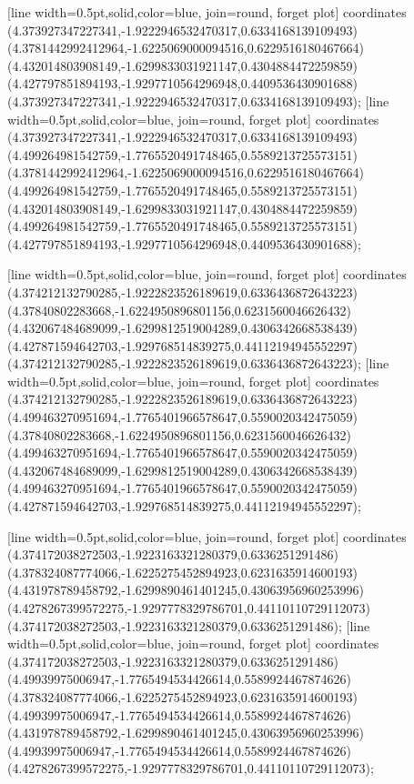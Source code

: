 [line width=0.5pt,solid,color=blue, join=round, forget plot] coordinates {(4.373927347227341,-1.9222946532470317,0.6334168139109493) (4.3781442992412964,-1.6225069000094516,0.6229516180467664) (4.432014803908149,-1.6299833031921147,0.4304884472259859) (4.427797851894193,-1.9297710564296948,0.4409536430901688) (4.373927347227341,-1.9222946532470317,0.6334168139109493)};
[line width=0.5pt,solid,color=blue, join=round, forget plot] coordinates {(4.373927347227341,-1.9222946532470317,0.6334168139109493) (4.499264981542759,-1.7765520491748465,0.5589213725573151) (4.3781442992412964,-1.6225069000094516,0.6229516180467664) (4.499264981542759,-1.7765520491748465,0.5589213725573151) (4.432014803908149,-1.6299833031921147,0.4304884472259859) (4.499264981542759,-1.7765520491748465,0.5589213725573151) (4.427797851894193,-1.9297710564296948,0.4409536430901688)};

[line width=0.5pt,solid,color=blue, join=round, forget plot] coordinates {(4.374212132790285,-1.9222823526189619,0.6336436872643223) (4.37840802283668,-1.6224950896801156,0.6231560046626432) (4.432067484689099,-1.6299812519004289,0.4306342668538439) (4.427871594642703,-1.929768514839275,0.44112194945552297) (4.374212132790285,-1.9222823526189619,0.6336436872643223)};
[line width=0.5pt,solid,color=blue, join=round, forget plot] coordinates {(4.374212132790285,-1.9222823526189619,0.6336436872643223) (4.499463270951694,-1.7765401966578647,0.5590020342475059) (4.37840802283668,-1.6224950896801156,0.6231560046626432) (4.499463270951694,-1.7765401966578647,0.5590020342475059) (4.432067484689099,-1.6299812519004289,0.4306342668538439) (4.499463270951694,-1.7765401966578647,0.5590020342475059) (4.427871594642703,-1.929768514839275,0.44112194945552297)};

[line width=0.5pt,solid,color=blue, join=round, forget plot] coordinates {(4.374172038272503,-1.9223163321280379,0.6336251291486) (4.378324087774066,-1.6225275452894923,0.6231635914600193) (4.431978789458792,-1.6299890461401245,0.43063956960253996) (4.4278267399572275,-1.9297778329786701,0.44110110729112073) (4.374172038272503,-1.9223163321280379,0.6336251291486)};
[line width=0.5pt,solid,color=blue, join=round, forget plot] coordinates {(4.374172038272503,-1.9223163321280379,0.6336251291486) (4.49939975006947,-1.7765494534426614,0.5589924467874626) (4.378324087774066,-1.6225275452894923,0.6231635914600193) (4.49939975006947,-1.7765494534426614,0.5589924467874626) (4.431978789458792,-1.6299890461401245,0.43063956960253996) (4.49939975006947,-1.7765494534426614,0.5589924467874626) (4.4278267399572275,-1.9297778329786701,0.44110110729112073)};

